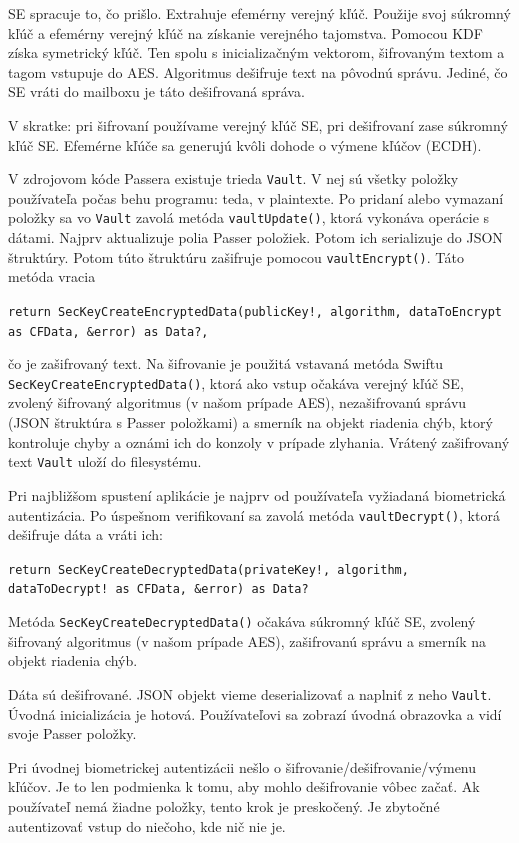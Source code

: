 SE spracuje to, čo prišlo. Extrahuje efemérny verejný kľúč. Použije svoj súkromný kľúč a efemérny verejný kľúč na získanie verejného tajomstva. Pomocou KDF získa symetrický kľúč. Ten spolu s inicializačným vektorom, šifrovaným textom a tagom vstupuje do AES. Algoritmus dešifruje text na pôvodnú správu. Jediné, čo SE vráti do mailboxu je táto dešifrovaná správa.

V skratke: pri šifrovaní používame verejný kľúč SE, pri dešifrovaní zase súkromný kľúč SE. Efemérne kľúče sa generujú kvôli dohode o výmene kľúčov (ECDH). 

V zdrojovom kóde Passera existuje trieda \texttt{Vault}. V nej sú všetky položky používateľa počas behu programu: teda, v plaintexte. Po pridaní alebo vymazaní položky sa vo \texttt{Vault} zavolá metóda \texttt{vaultUpdate()}, ktorá vykonáva operácie s dátami. Najprv aktualizuje polia Passer položiek. Potom ich serializuje do JSON štruktúry. Potom túto štruktúru zašifruje pomocou \texttt{vaultEncrypt()}. Táto metóda vracia 
\begin{center}
    \texttt{return SecKeyCreateEncryptedData(publicKey!, algorithm, dataToEncrypt as CFData, \&error) as Data?,}
\end{center}
\begin{sloppypar}
    \noindent čo je zašifrovaný text. Na šifrovanie je použitá vstavaná metóda Swiftu \texttt{SecKeyCreateEncryptedData()}, ktorá ako vstup očakáva verejný kľúč SE, zvolený šifrovaný algoritmus (v našom prípade AES), nezašifrovanú správu (JSON štruktúra s Passer položkami) a smerník na objekt riadenia chýb, ktorý kontroluje chyby a oznámi ich do konzoly v prípade zlyhania. Vrátený zašifrovaný text \texttt{Vault} uloží do filesystému.
\end{sloppypar}

Pri najbližšom spustení aplikácie je najprv od používateľa vyžiadaná biometrická autentizácia. Po úspešnom verifikovaní sa zavolá metóda \texttt{vaultDecrypt()}, ktorá dešifruje dáta a vráti ich: 
\begin{center}
    \texttt{return SecKeyCreateDecryptedData(privateKey!, algorithm, dataToDecrypt! as CFData, \&error) as Data?}
\end{center}
\begin{sloppypar}
    \noindent Metóda \texttt{SecKeyCreateDecryptedData()} očakáva súkromný kľúč SE, zvolený šifrovaný algoritmus (v našom prípade AES), zašifrovanú správu a smerník na objekt riadenia chýb.
\end{sloppypar}

Dáta sú dešifrované. JSON objekt vieme deserializovať a naplniť z neho \texttt{Vault}. Úvodná inicializácia je hotová. Používateľovi sa zobrazí úvodná obrazovka a vidí svoje Passer položky. 

Pri úvodnej biometrickej autentizácii nešlo o šifrovanie/dešifrovanie/výmenu kľúčov. Je to len podmienka k tomu, aby mohlo dešifrovanie vôbec začať. Ak používateľ nemá žiadne položky, tento krok je preskočený. Je zbytočné autentizovať vstup do niečoho, kde nič nie je.
